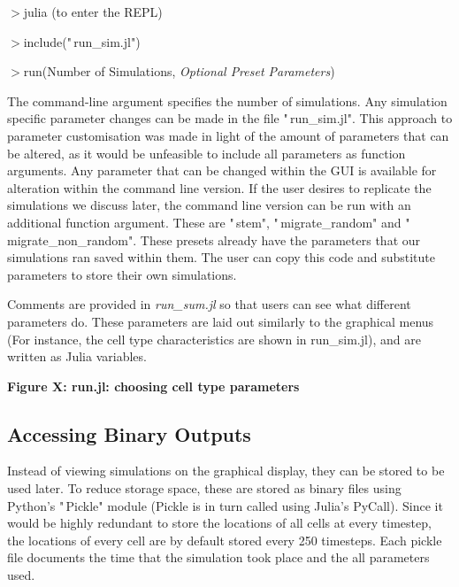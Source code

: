 \documentclass[12pt,a4paper]{report}
\begin{document}
$>$julia (to enter the REPL)

$>$include("\,run\_sim.jl")

$>$run(Number of Simulations, {\itshape Optional Preset Parameters})



The command-line argument specifies the number of simulations. Any 
simulation specific parameter changes can be made in the file 
"\,run\_sim.jl". This approach to parameter customisation was made in 
light of the amount of parameters that can be altered, as it would be 
unfeasible to include all parameters as function arguments. Any 
parameter that can be changed within the GUI is available for alteration 
within the command line version. If the user desires to replicate the 
simulations we discuss later, the command line version can be run with 
an additional function argument. These are "\,stem", "\,migrate\_random" 
and "\,migrate\_non\_random". These presets already have the parameters 
that our simulations ran saved within them. The user can copy this code 
and substitute parameters to store their own simulations.



Comments are provided in {\itshape run\_sum.jl} so that users can see 
what different parameters do. These parameters are laid out similarly to 
the graphical menus (For instance, the cell type characteristics are 
shown in run\_sim.jl), and are written as Julia variables.

\begin{figure}[H]
\centering
\end{figure}


{\bfseries Figure X: run.jl: choosing cell type parameters}

\subsection{Accessing Binary Outputs}
Instead of viewing simulations on the graphical display, they can be 
stored to be used later. To reduce storage space, these are stored as 
binary files using Python's "\,Pickle" module (Pickle is in turn called 
using Julia's PyCall). Since it would be highly redundant to store the 
locations of all cells at every timestep, the locations of every cell 
are by default stored every 250 timesteps. Each pickle file documents 
the time that the simulation took place and the all parameters used.
\end{document}
